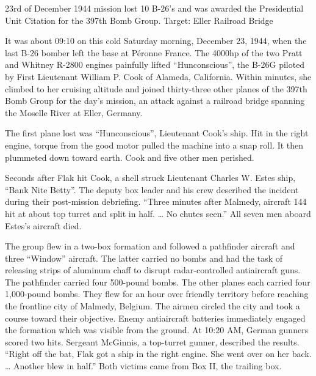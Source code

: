 \documentclass{article}
\begin{document}
\begin{multicols}{3}
23rd of December 1944 mission lost 10 B-26's and was awarded the 
Presidential Unit Citation for the 397th Bomb Group. Target: Eller 
Railroad Bridge

\closearticle



It was about 09:10 on this cold Saturday morning, December 23, 1944, 
when the last B-26 bomber left the base at Péronne France. The 4000hp 
of the two Pratt and Whitney R-2800 engines painfully lifted 
``Hunconscious”, the B-26G piloted by First Lieutenant William P. 
Cook of Alameda, California. Within minutes, she climbed to her 
cruising altitude and joined thirty-three other planes of the 
397th Bomb Group for the day’s mission, an attack against a railroad 
bridge spanning the Moselle River at Eller, Germany.

The first plane lost was ``Hunconscious”, Lieutenant Cook’s ship. 
Hit in the right engine, torque from the good motor pulled the 
machine into a snap roll. It then plummeted down toward earth. 
Cook and five other men perished.

Seconds after Flak hit Cook, a shell struck Lieutenant 
Charles W. Estes ship, ``Bank Nite Betty”. The deputy box 
leader and his crew described the incident during their 
post-mission debriefing. ``Three minutes after Malmedy, aircraft 
144 hit at about top turret and split in half. … No chutes seen.” 
All seven men aboard Estes’s aircraft died.

The group flew in a two-box formation and followed a pathfinder 
aircraft and three ``Window” aircraft. The latter carried 
no bombs and had the task of releasing strips of aluminum 
chaff to disrupt radar-controlled antiaircraft guns. The 
pathfinder carried four 500-pound bombs. The other planes 
each carried four 1,000-pound bombs. They flew for an hour 
over friendly territory before reaching the frontline city 
of Malmedy, Belgium. The airmen circled the city and took 
a course toward their objective. Enemy antiaircraft batteries 
immediately engaged the formation which was visible from the 
ground. At 10:20 AM, German gunners scored two hits. Sergeant 
McGinnis, a top-turret gunner, described the results. 
``Right off the bat, Flak got a ship in the right engine. 
She went over on her back. … Another blew in half.” 
Both victims came from Box II, the trailing box.


\end{multicols}
\end{document}
